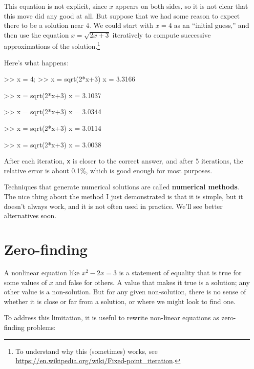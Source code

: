 \documentclass[
]{book}
\numberwithin{Answer}{chapter}
\numberwithin{Exercise}{chapter}
\begin{document}
This equation is not explicit, since $x$ appears on both sides, so
it is not clear that this move did any good at all.  But suppose
that we had some reason to expect there to be a solution near 4.
We could start with $x=4$ as an ``initial guess,'' and then use
the equation $x = \sqrt{2x+3}$ iteratively to compute successive
approximations of the solution.\footnote{To understand why this
(sometimes) works, see \url{https://en.wikipedia.org/wiki/Fixed-point_iteration}.}


Here's what happens:

\begin{code}
>> x = 4;
>> x = sqrt(2*x+3)
x = 3.3166

>> x = sqrt(2*x+3)
x = 3.1037

>> x = sqrt(2*x+3)
x = 3.0344

>> x = sqrt(2*x+3)
x = 3.0114

>> x = sqrt(2*x+3)
x = 3.0038
\end{code}

After each iteration, {\tt x} is closer to the correct answer,
and after 5 iterations, the relative error is about 0.1\%, which
is good enough for most purposes.


Techniques that generate numerical solutions are called
{\bf numerical methods}.  
The nice thing about the method I
just demonstrated is that it is simple, but it doesn't always
work, and it is not often used in practice.
We'll see better alternatives soon.



\section{Zero-finding}
\label{sect:zero}

A nonlinear equation like $x^2 - 2x = 3$ is a statement of
equality that is true for some values of $x$ and false for
others.  A value that makes it true is a solution;
any other value is a non-solution.  But for any given non-solution,
there is no sense of whether it is close or far from a solution,
or where we might look to find one.


To address this limitation, it is useful to
rewrite non-linear equations as zero-finding problems:
\end{document}
